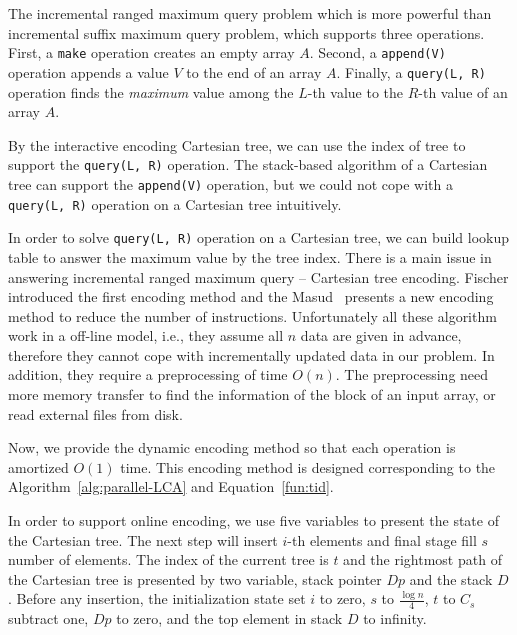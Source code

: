 


The incremental ranged maximum query problem which is more powerful than
incremental suffix maximum query problem, which supports three
operations.  First, a {\tt make} operation creates an empty array $A$.
Second, a {\tt append(V) } operation appends a value $V$ to the end of
an array $A$.  Finally, a {\tt query(L, R)} operation finds the {\em
maximum} value among the $L$-th value to the $R$-th value of an array
$A$.  


By the interactive encoding Cartesian tree, we can use the index of tree
to support the {\tt query(L, R)} operation.  The stack-based algorithm
of a Cartesian tree can support the {\tt append(V)} operation, but we
could not cope with a {\tt query(L, R)} operation on a Cartesian tree
intuitively.


In order to solve {\tt query(L, R)} operation on a Cartesian tree, we
can build lookup table to answer the maximum value by the tree index.
There is a main issue in answering incremental ranged maximum query --
Cartesian tree encoding.  Fischer introduced the first encoding method
and the Masud~\cite{Hasan2010CacheOA} presents a new encoding method to
reduce the number of instructions.  Unfortunately all these algorithm
work in a off-line model, i.e., they assume all $n$ data are given in
advance, therefore they cannot cope with incrementally updated data in
our problem.  In addition, they require a preprocessing of time $O(n)$.
The preprocessing need more memory transfer to find the information of
the block of an input array, or read external files from disk.


Now, we provide the dynamic encoding method so that each operation is
amortized $O(1)$ time.  This encoding method is designed corresponding
to the Algorithm~\ref{alg:parallel-LCA} and Equation~\ref{fun:tid}.

In order to support online encoding, we use five variables to present
the state of the Cartesian tree.  The next step will insert $i$-th
elements and final stage fill $s$ number of elements.  The index of the
current tree is ${\mathit t}$ and the rightmost path of the Cartesian
tree is presented by two variable, stack pointer ${\mathit Dp}$ and the
stack ${\mathit D}$.  Before any insertion, the initialization state set
$i$ to zero, $s$ to $\frac{\log n}{4}$, ${\mathit t}$ to $C_s$ subtract
one, ${\mathit Dp}$ to zero, and the top element in stack ${\mathit D}$
to infinity.

